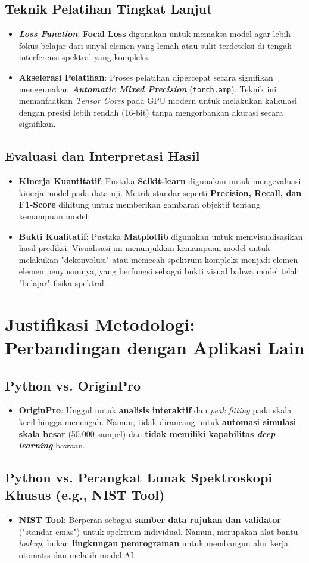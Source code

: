\documentclass[12pt, a4paper]{article}
\newcommand{\subsectiontitle}[1]{\subsection*{\large\bfseries #1}}
\begin{document}
\subsectiontitle{Teknik Pelatihan Tingkat Lanjut}
\begin{itemize}
    \item \textbf{\textit{Loss Function}}: \textbf{Focal Loss} digunakan untuk memaksa model agar lebih fokus belajar dari sinyal elemen yang lemah atau sulit terdeteksi di tengah interferensi spektral yang kompleks.
    \item \textbf{Akselerasi Pelatihan}: Proses pelatihan dipercepat secara signifikan menggunakan \textbf{\textit{Automatic Mixed Precision}} (\texttt{torch.amp}). Teknik ini memanfaatkan \textit{Tensor Cores} pada GPU modern untuk melakukan kalkulasi dengan presisi lebih rendah (16-bit) tanpa mengorbankan akurasi secara signifikan.
\end{itemize}

\subsectiontitle{Evaluasi dan Interpretasi Hasil}
\begin{itemize}
    \item \textbf{Kinerja Kuantitatif}: Pustaka \textbf{Scikit-learn} digunakan untuk mengevaluasi kinerja model pada data uji. Metrik standar seperti \textbf{Precision, Recall, dan F1-Score} dihitung untuk memberikan gambaran objektif tentang kemampuan model.
    \item \textbf{Bukti Kualitatif}: Pustaka \textbf{Matplotlib} digunakan untuk memvisualisasikan hasil prediksi. Visualisasi ini menunjukkan kemampuan model untuk melakukan "dekonvolusi" atau memecah spektrum kompleks menjadi elemen-elemen penyusunnya, yang berfungsi sebagai bukti visual bahwa model telah "belajar" fisika spektral.
\end{itemize}

\section{Justifikasi Metodologi: Perbandingan dengan Aplikasi Lain}

\subsectiontitle{Python vs. OriginPro}
\begin{itemize}
    \item \textbf{OriginPro}: Unggul untuk \textbf{analisis interaktif} dan \textit{peak fitting} pada skala kecil hingga menengah. Namun, tidak dirancang untuk \textbf{automasi simulasi skala besar} (50.000 sampel) dan \textbf{tidak memiliki kapabilitas \textit{deep learning}} bawaan.
\end{itemize}

\subsectiontitle{Python vs. Perangkat Lunak Spektroskopi Khusus (e.g., NIST Tool)}
\begin{itemize}
    \item \textbf{NIST Tool}: Berperan sebagai \textbf{sumber data rujukan dan validator} ("standar emas") untuk spektrum individual. Namun, merupakan alat bantu \textit{lookup}, bukan \textbf{lingkungan pemrograman} untuk membangun alur kerja otomatis dan melatih model AI.
\end{itemize}
\end{document}
